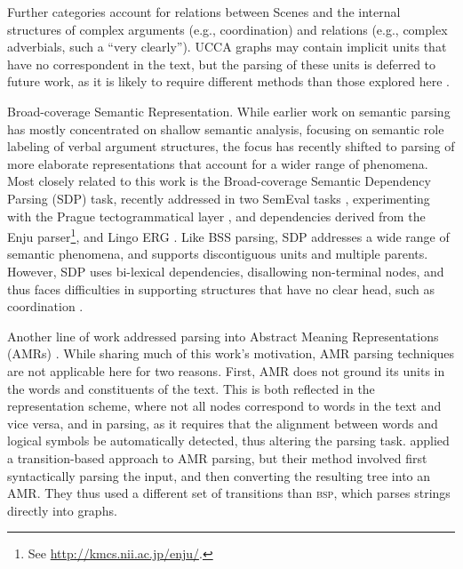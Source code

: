 \documentclass[11pt]{article}
\makeatletter
\renewcommand{\paragraph}{
  \@startsection{paragraph}{4}
  {\z@}{.5ex \@plus .5ex \@minus .2ex}{-1em}
  {\normalfont\normalsize\bfseries}
}
\makeatother
\begin{document}
Further categories account for relations between Scenes and the internal structures of
complex arguments (e.g., coordination) and relations
(e.g., complex adverbials, such a ``very clearly''). UCCA graphs may contain implicit
units that have no correspondent in the text, but the parsing of these
units is deferred to future work, as it is likely to require different methods
than those explored here \cite{roth2015inducing}.


\paragraph{Broad-coverage Semantic Representation.}
While earlier work on semantic parsing has mostly concentrated on shallow semantic analysis,
focusing on semantic role labeling of verbal argument structures,
the focus has recently shifted to parsing of more elaborate representations that account
for a wider range of phenomena. 
Most closely related to this work is the Broad-coverage Semantic Dependency Parsing (SDP) task,
recently addressed in two SemEval tasks \cite{oepen2014semeval,oepen2015semeval},
experimenting with the Prague tectogrammatical layer \cite{bohmova2003prague},
and dependencies derived from the Enju parser\footnote{See \url{http://kmcs.nii.ac.jp/enju/}.},
and Lingo ERG \cite{Flic:02}.
Like BSS parsing, SDP addresses a wide range of semantic phenomena,
and supports discontiguous units and multiple parents. However, SDP uses
bi-lexical dependencies, disallowing non-terminal nodes, and thus faces difficulties in supporting
structures that have no clear head, such as coordination \cite{Ivanova2012who}.

Another line of work addressed parsing into Abstract Meaning Representations (AMRs)
\cite{flanigan2014discriminative,vanderwende2015amr,pust2015parsing,artzi2015broad}. 
While sharing much of this work's motivation, AMR parsing techniques are not applicable
here for two reasons. 
First, AMR does not ground its units in the words and constituents of the text.
This is both reflected in the representation scheme,
where not all nodes correspond to words in the text and vice versa, and in
parsing, as it requires that the alignment between words and logical symbols be
automatically detected, thus altering the parsing task.
 applied a transition-based approach to AMR parsing,
but their method involved first syntactically parsing the input, and then converting
the resulting tree into an AMR. They thus used a different set of transitions than
\textsc{bsp}, which parses strings directly into graphs.
\end{document}
